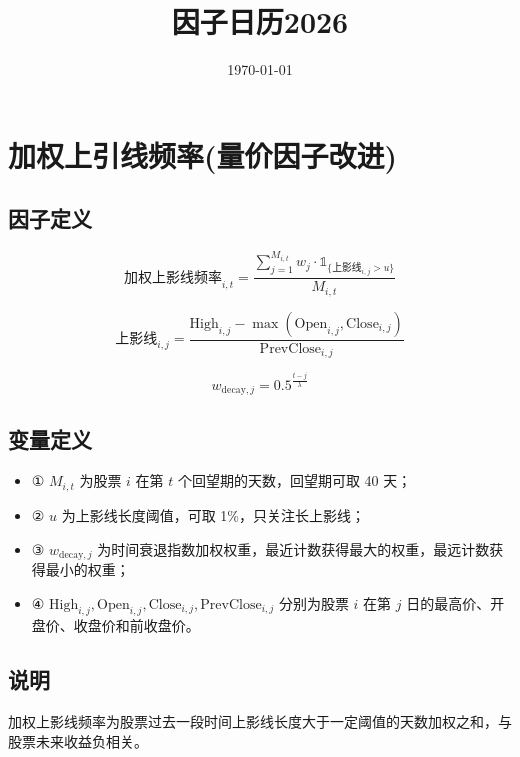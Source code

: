 \documentclass{article}
\title{因子日历2026}
\date{\today}
\begin{document}
\maketitle

\section{加权上引线频率(量价因子改进)}

\subsection{因子定义}

\begin{equation}
    \text{加权上影线频率}_{i,t} = \frac{\sum_{j=1}^{M_{i,t}} w_j \cdot \mathbb{1}_{\{ \text{上影线}_{i,j} > u \}}}{M_{i,t}}
\end{equation}

\begin{equation}
    \text{上影线}_{i,j} = \frac{\mathrm{High}_{i,j} - \max(\mathrm{Open}_{i,j}, \mathrm{Close}_{i,j})}{\mathrm{PrevClose}_{i,j}}
\end{equation}

\begin{equation}
    w_{\mathrm{decay},j} = 0.5^{\frac{t-j}{\lambda}}
\end{equation}

\subsection{变量定义}
\begin{itemize}
    \item ① \( M_{i,t} \) 为股票 \( i \) 在第 \( t \) 个回望期的天数，回望期可取 40 天；
    \item ② \( u \) 为上影线长度阈值，可取 1\%，只关注长上影线；
    \item ③ \( w_{\mathrm{decay},j} \) 为时间衰退指数加权权重，最近计数获得最大的权重，最远计数获得最小的权重；
    \item ④ \( \mathrm{High}_{i,j}, \mathrm{Open}_{i,j}, \mathrm{Close}_{i,j}, \mathrm{PrevClose}_{i,j} \) 分别为股票 \( i \) 在第 \( j \) 日的最高价、开盘价、收盘价和前收盘价。
\end{itemize}

\subsection{说明}
加权上影线频率为股票过去一段时间上影线长度大于一定阈值的天数加权之和，与股票未来收益负相关。
\end{document}
